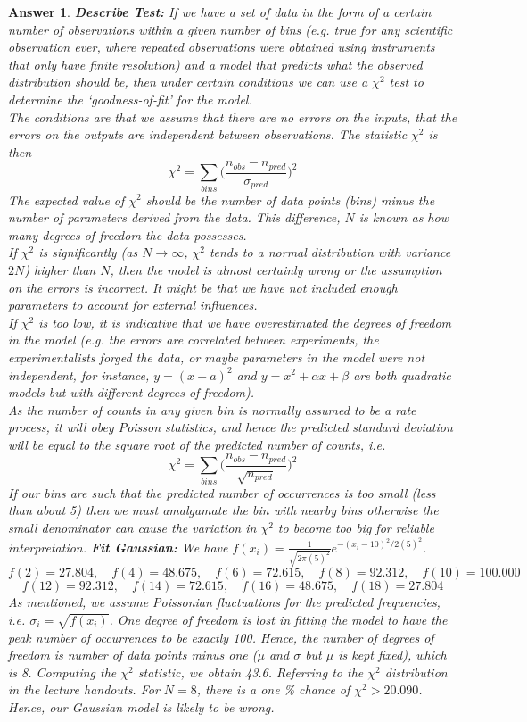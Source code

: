 \documentclass[a4paper]{article}
\newtheorem{ans}{Answer}[section]
\theoremstyle{new}
\begin{document}
\begin{ans}
\textbf{Describe Test:} If we have a set of data in the form of a certain number of observations within a given number of bins (e.g. true for any scientific observation ever, where repeated observations were obtained using instruments that only have finite resolution) and a model that predicts what the observed distribution should be, then under certain conditions we can use a $\chi^2$ test to determine the `goodness-of-fit' for the model.\\[5pt]
The conditions are that we assume that there are no errors on the inputs, that the errors on the outputs are independent between observations. The statistic $\chi^2$ is then
$$\chi^2=\sum_{bins}\bigg(\frac{n_{obs}-n_{pred}}{\sigma_{pred}}\bigg)^2$$
The expected value of $\chi^2$ should be the number of data points (bins) minus the number of parameters derived from the data. This difference, $N$ is known as how many degrees of freedom the data possesses.\\[5pt]
If $\chi^2$ is significantly (as $N \rightarrow\infty$, $\chi^2$ tends to a normal distribution with variance $2N$) higher than $N$, then the model is almost certainly wrong or the assumption on the errors is incorrect. It might be that we have not included enough parameters to account for external influences.\\[5pt]
If $\chi^2$ is too low, it is indicative that we have overestimated the degrees of freedom in the model (e.g. the errors are correlated between experiments, the experimentalists forged the data, or maybe parameters in the model were not independent, for instance, $y=(x-a)^2$ and $y=x^2+\alpha x+\beta$ are both quadratic models but with different degrees of freedom).\\[5pt]
As the number of counts in any given bin is normally assumed to be a rate process, it will obey Poisson statistics, and hence the predicted standard deviation will be equal to the square root of the predicted number of counts, i.e.
$$\chi^2=\sum_{bins}\bigg(\frac{n_{obs}-n_{pred}}{\sqrt{n_{pred}}}\bigg)^2$$
If our bins are such that the predicted number of occurrences is too small (less than about 5) then we must amalgamate the bin with nearby bins otherwise the small denominator can cause the variation in $\chi^2$ to become too big for reliable interpretation.
\newpage
\textbf{Fit Gaussian: } We have $f(x_i)=\frac{1}{\sqrt{2\pi(5)^2}}e^{-(x_i-10)^2/2(5)^2}$. 
$$f(2)=27.804,\quad f(4)=48.675,\quad f(6)=72.615,\quad f(8)=92.312,\quad f(10)=100.000$$
$$f(12)=92.312,\quad f(14)=72.615,\quad f(16)=48.675,\quad f(18)=27.804$$
As mentioned, we assume Poissonian fluctuations for the predicted frequencies, i.e. $\sigma_i=\sqrt{f(x_i)}$. One degree of freedom is lost in fitting the model to have the peak number of occurrences to be exactly 100. Hence, the number of degrees of freedom is number of data points minus one ($\mu$ and $\sigma$ but $\mu$ is kept fixed), which is 8. Computing the $\chi^2$ statistic, we obtain 43.6. Referring to the $\chi^2$ distribution in the lecture handouts. For $N=8$, there is a one \% chance of $\chi^2>20.090$. Hence, our Gaussian model is likely to be wrong.
\end{ans}
\newpage
\end{document}

